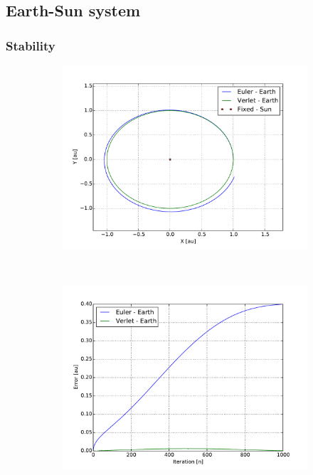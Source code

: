 










\subsection{Earth-Sun system}








\subsubsection{Stability}

\begin{figure}[H]
    \centering
    \begin{subfigure}{0.5\textwidth}
        \centering
        \includegraphics[width=\linewidth]{result/bilder/earth-sun.pdf}
    	\caption{}
    \end{subfigure}%
    ~ 
    \begin{subfigure}{0.5\textwidth}
        \centering
        \includegraphics[width=\linewidth]{result/bilder/earth-sun-error.pdf}

\end{subfigure}
\end{figure}
